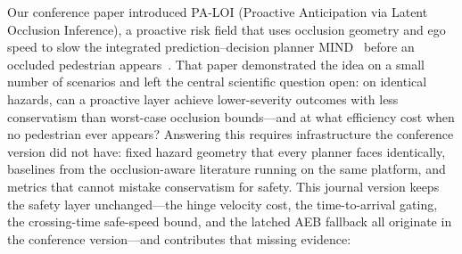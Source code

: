 \documentclass[journal]{IEEEtran}
\begin{document}
Our conference paper introduced PA-LOI (Proactive Anticipation via Latent Occlusion Inference), a proactive risk field that uses occlusion geometry and ego speed to slow the integrated prediction--decision planner MIND~\cite{mind2025} before an occluded pedestrian appears~\cite{paloi_itsc2026}. That paper demonstrated the idea on a small number of scenarios and left the central scientific question open: on identical hazards, can a proactive layer achieve lower-severity outcomes with less conservatism than worst-case occlusion bounds---and at what efficiency cost when no pedestrian ever appears? Answering this requires infrastructure the conference version did not have: fixed hazard geometry that every planner faces identically, baselines from the occlusion-aware literature running on the same platform, and metrics that cannot mistake conservatism for safety. This journal version keeps the safety layer unchanged---the hinge velocity cost, the time-to-arrival gating, the crossing-time safe-speed bound, and the latched AEB fallback all originate in the conference version---and contributes that missing evidence:
\end{document}
